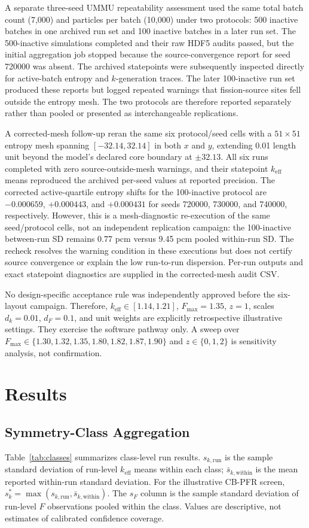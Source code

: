 \documentclass[conference]{IEEEtran}
\begin{document}
A separate three-seed UMMU repeatability assessment used the same total batch count (7,000) and particles per batch (10,000) under two protocols: 500 inactive batches in one archived run set and 100 inactive batches in a later run set. The 500-inactive simulations completed and their raw HDF5 audits passed, but the initial aggregation job stopped because the source-convergence report for seed 720000 was absent. The archived statepoints were subsequently inspected directly for active-batch entropy and $k$-generation traces. The later 100-inactive run set produced these reports but logged repeated warnings that fission-source sites fell outside the entropy mesh. The two protocols are therefore reported separately rather than pooled or presented as interchangeable replications.

A corrected-mesh follow-up reran the same six protocol/seed cells with a $51\times51$ entropy mesh spanning $[-32.14,32.14]$ in both $x$ and $y$, extending 0.01 length unit beyond the model's declared core boundary at $\pm32.13$. All six runs completed with zero source-outside-mesh warnings, and their statepoint $k_{\mathrm{eff}}$ means reproduced the archived per-seed values at reported precision. The corrected active-quartile entropy shifts for the 100-inactive protocol are $-0.000659$, $+0.000443$, and $+0.000431$ for seeds 720000, 730000, and 740000, respectively. However, this is a mesh-diagnostic re-execution of the same seed/protocol cells, not an independent replication campaign: the 100-inactive between-run SD remains 0.77 pcm versus 9.45 pcm pooled within-run SD. The recheck resolves the warning condition in these executions but does not certify source convergence or explain the low run-to-run dispersion. Per-run outputs and exact statepoint diagnostics are supplied in the corrected-mesh audit CSV.

No design-specific acceptance rule was independently approved before the six-layout campaign. Therefore, \(k_{\mathrm{eff}}\in[1.14,1.21]\), \(F_{\max}=1.35\), \(z=1\), scales \(d_k=0.01\), \(d_F=0.1\), and unit weights are explicitly retrospective illustrative settings. They exercise the software pathway only. A sweep over \(F_{\max}\in\{1.30,1.32,1.35,1.80,1.82,1.87,1.90\}\) and \(z\in\{0,1,2\}\) is sensitivity analysis, not confirmation.

\section{Results}
\subsection{Symmetry-Class Aggregation}
Table~\ref{tab:classes} summarizes class-level run results. \(s_{k,\mathrm{run}}\) is the sample standard deviation of run-level \(k_{\mathrm{eff}}\) means within each class; \(\bar{s}_{k,\mathrm{within}}\) is the mean reported within-run standard deviation. For the illustrative CB-PFR screen, \(s_k^*=\max(s_{k,\mathrm{run}},\bar{s}_{k,\mathrm{within}})\). The \(s_F\) column is the sample standard deviation of run-level \(F\) observations pooled within the class. Values are descriptive, not estimates of calibrated confidence coverage.
\end{document}
